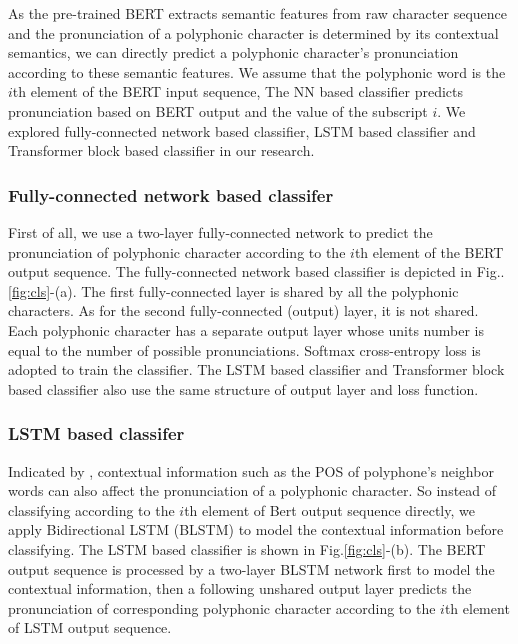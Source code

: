\documentclass[a4paper]{article}
\begin{document}
As the pre-trained BERT extracts semantic features from raw character sequence and the pronunciation of a polyphonic character is determined by its contextual semantics, we can directly predict a polyphonic character's pronunciation according to these semantic features. We assume that the polyphonic word is the $i$th element of the BERT input sequence, The NN based classifier predicts pronunciation based on BERT output and the value of the subscript $i$. We explored fully-connected network based classifier, LSTM based classifier and Transformer block based classifier in our research.

\subsubsection{Fully-connected network based classifer}


First of all, we use a two-layer fully-connected network to predict the pronunciation of polyphonic character according to the $i$th element of the BERT output sequence. The fully-connected network based classifier is depicted in Fig..\ref{fig:cls}-(a). The first fully-connected layer is shared by all the polyphonic characters. As for the second fully-connected (output) layer, it is not shared.  Each polyphonic character has a separate output layer whose units number is equal to the number of possible pronunciations. Softmax cross-entropy loss is adopted to train the classifier. The  LSTM based classifier and Transformer block based classifier also use the same structure of output layer and loss function.


\subsubsection{LSTM based classifer}


Indicated by \cite{shan2016bi}, contextual information such as the POS of polyphone's neighbor words can also affect the pronunciation of a polyphonic character.  So instead of classifying according to the $i$th element of Bert output sequence directly, we apply Bidirectional LSTM (BLSTM) to model the contextual information before classifying. The LSTM based classifier is shown in Fig.\ref{fig:cls}-(b). The BERT output sequence is processed by a two-layer BLSTM network first to model the contextual information, then a following unshared output layer predicts the pronunciation of corresponding polyphonic character according to the $i$th element of LSTM output sequence. 
\end{document}
